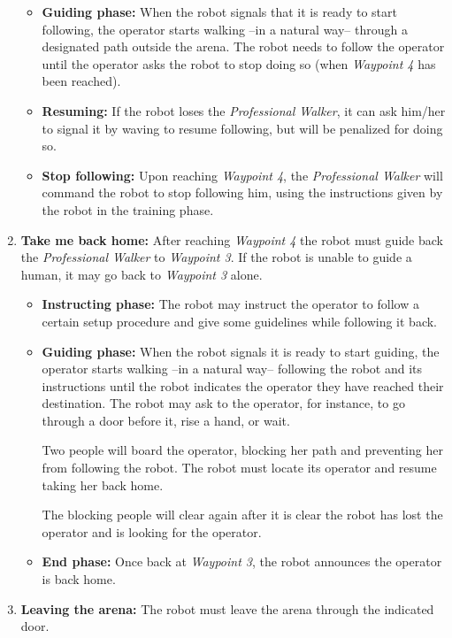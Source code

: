 \begin{enumerate}
\begin{itemize}
		\item \textbf{Guiding phase:} When the robot signals that it is ready to start following, the operator starts walking --in a natural way-- through a designated path outside the arena. The robot needs to follow the operator until the operator asks the robot to stop doing so (when \textit{Waypoint 4} has been reached).

		\item \textbf{Resuming:} If the robot loses the \textit{Professional Walker}, it can ask him/her to signal it by waving to resume following, but will be penalized for doing so.

		\item \textbf{Stop following:} Upon reaching \textit{Waypoint 4}, the \textit{Professional Walker} will command the robot to stop following him, using the instructions given by the robot in the training phase.
	\end{itemize}
	
	\item \textbf{Take me back home:} After reaching \textit{Waypoint 4} the robot must guide back the \textit{Professional Walker} to \textit{Waypoint 3}. If the robot is unable to guide a human, it may go back to \textit{Waypoint 3} alone.
	\begin{itemize}
		\item \textbf{Instructing phase:} The robot may instruct the operator to follow a certain setup procedure and give some guidelines while following it back.
		
		\item \textbf{Guiding phase:} When the robot signals it is ready to start guiding, the operator starts walking --in a natural way-- following the robot and its instructions until the robot indicates the operator they have reached their destination. The robot may ask to the operator, for instance, to go through a door before it, rise a hand, or wait.

		Two people will board the operator, blocking her path and preventing her from following the robot. The robot must locate its operator and resume taking her back home. 
		
		The blocking people will clear again after it is clear the robot has lost the operator and is looking for the operator.

		\item \textbf{End phase:} Once back at \textit{Waypoint 3}, the robot announces the operator is back home. 
	\end{itemize}
	
	\item \textbf{Leaving the arena:} The robot must leave the arena through the indicated door.
\end{enumerate}

